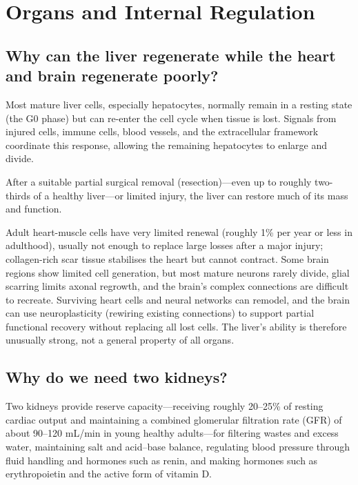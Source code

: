 \documentclass[11pt,oneside]{report}
\begin{document}
\chapter{Organs and Internal Regulation}

\section{Why can the liver regenerate while the heart and brain regenerate poorly?}

Most mature liver cells, especially hepatocytes, normally remain in a resting
state (the G0 phase) but can re-enter the cell cycle when tissue is lost.
Signals from injured cells, immune cells, blood vessels, and the extracellular
framework coordinate this response, allowing the remaining hepatocytes to
enlarge and divide.

After a suitable partial surgical removal (resection)—even up to roughly
two-thirds of a healthy liver—or limited injury, the liver can restore
much of its mass and function.

Adult heart-muscle cells have very limited renewal (roughly 1\% per year or
less in adulthood), usually not enough to replace large losses after a major
injury; collagen-rich scar tissue stabilises the heart but cannot contract.
Some brain regions show limited cell generation, but most mature neurons rarely
divide, glial scarring limits axonal regrowth, and the brain's complex
connections are difficult to recreate. Surviving heart cells and neural
networks can remodel, and the brain can use neuroplasticity (rewiring existing
connections) to support partial functional recovery without replacing all lost
cells. The liver's ability is therefore unusually strong,
not a general property of all organs.

\section{Why do we need two kidneys?}

Two kidneys provide reserve capacity—receiving roughly 20--25\% of resting
cardiac output and maintaining a combined glomerular filtration rate (GFR) of
about 90--120 mL/min in young healthy adults—for filtering wastes and excess
water, maintaining salt and acid--base balance, regulating blood pressure
through fluid handling and hormones such as renin, and making hormones such as
erythropoietin and the active form of vitamin D.
\end{document}
